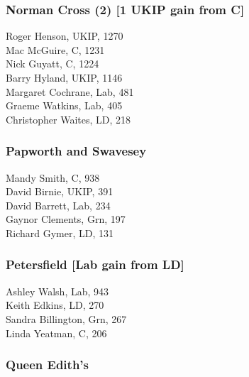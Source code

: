 \documentclass[a4paper,openany,10pt]{book}
\begin{document}
\subsubsection*{Norman Cross (2) \hspace*{\fill}\nolinebreak[1]%
\enspace\hspace*{\fill}
[1 UKIP gain from C]}



Roger Henson, UKIP, 1270\\
Mac McGuire, C, 1231\\
Nick Guyatt, C, 1224\\
Barry Hyland, UKIP, 1146\\
Margaret Cochrane, Lab, 481\\
Graeme Watkins, Lab, 405\\
Christopher Waites, LD, 218\\


\subsubsection*{Papworth and Swavesey}



Mandy Smith, C, 938\\
David Birnie, UKIP, 391\\
David Barrett, Lab, 234\\
Gaynor Clements, Grn, 197\\
Richard Gymer, LD, 131\\


\subsubsection*{Petersfield \hspace*{\fill}\nolinebreak[1]%
\enspace\hspace*{\fill}
[Lab gain from LD]}



Ashley Walsh, Lab, 943\\
Keith Edkins, LD, 270\\
Sandra Billington, Grn, 267\\
Linda Yeatman, C, 206\\


\subsubsection*{Queen Edith's}
\end{document}

